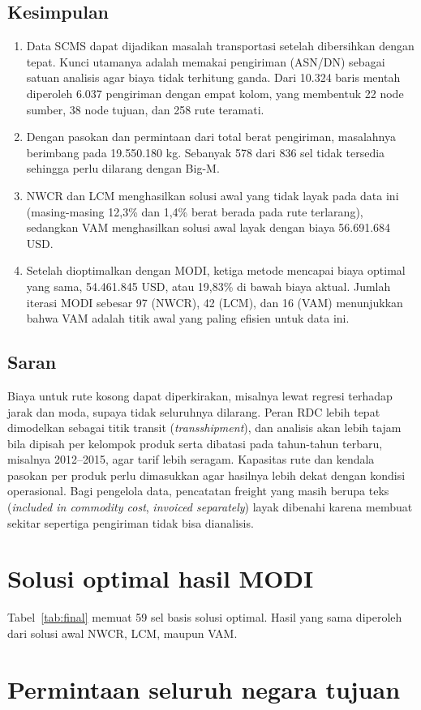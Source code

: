 \documentclass[a4paper,11pt]{article}
\begin{document}
\subsection{Kesimpulan}
\begin{enumerate}
\item Data SCMS dapat dijadikan masalah transportasi setelah dibersihkan dengan tepat. Kunci utamanya adalah memakai pengiriman (ASN/DN) sebagai satuan analisis agar biaya tidak terhitung ganda. Dari 10.324 baris mentah diperoleh 6.037 pengiriman dengan empat kolom, yang membentuk 22 node sumber, 38 node tujuan, dan 258 rute teramati.
\item Dengan pasokan dan permintaan dari total berat pengiriman, masalahnya berimbang pada 19.550.180 kg. Sebanyak 578 dari 836 sel tidak tersedia sehingga perlu dilarang dengan Big-M.
\item NWCR dan LCM menghasilkan solusi awal yang tidak layak pada data ini (masing-masing 12,3\% dan 1,4\% berat berada pada rute terlarang), sedangkan VAM menghasilkan solusi awal layak dengan biaya 56.691.684 USD.
\item Setelah dioptimalkan dengan MODI, ketiga metode mencapai biaya optimal yang sama, 54.461.845 USD, atau 19,83\% di bawah biaya aktual. Jumlah iterasi MODI sebesar 97 (NWCR), 42 (LCM), dan 16 (VAM) menunjukkan bahwa VAM adalah titik awal yang paling efisien untuk data ini.
\end{enumerate}

\subsection{Saran}
Biaya untuk rute kosong dapat diperkirakan, misalnya lewat regresi terhadap jarak dan moda, supaya tidak seluruhnya dilarang. Peran RDC lebih tepat dimodelkan sebagai titik transit (\textit{transshipment}), dan analisis akan lebih tajam bila dipisah per kelompok produk serta dibatasi pada tahun-tahun terbaru, misalnya 2012--2015, agar tarif lebih seragam. Kapasitas rute dan kendala pasokan per produk perlu dimasukkan agar hasilnya lebih dekat dengan kondisi operasional. Bagi pengelola data, pencatatan freight yang masih berupa teks (\textit{included in commodity cost}, \textit{invoiced separately}) layak dibenahi karena membuat sekitar sepertiga pengiriman tidak bisa dianalisis.

\appendix
\section{Solusi optimal hasil MODI}
\label{app:final}
Tabel~\ref{tab:final} memuat 59 sel basis solusi optimal. Hasil yang sama diperoleh dari solusi awal NWCR, LCM, maupun VAM.
\begingroup\footnotesize\setlength{\tabcolsep}{4pt}

\endgroup

\section{Permintaan seluruh negara tujuan}
\label{app:demand}
\begingroup\footnotesize\setlength{\tabcolsep}{4pt}

\endgroup



\end{document}
